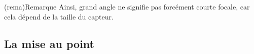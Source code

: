 \documentclass[../../main/main.tex]{subfiles}
\begin{document}
\begin{tcb}(rema){Remarque}
	Ainsi, grand angle ne signifie pas forcément courte focale, car cela dépend de
	la taille du capteur.
\end{tcb}

%
%
%
%
%
%

\subsection{La mise au point}
\end{document}
